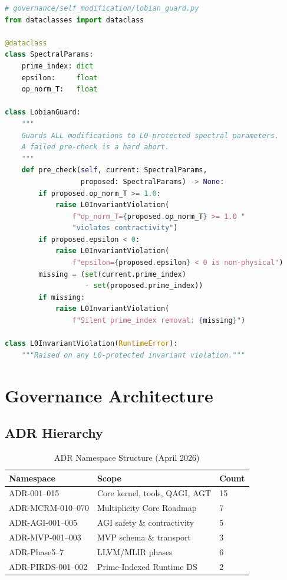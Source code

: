 \documentclass[12pt,a4paper]{article}
\theoremstyle{definition}
\theoremstyle{plain}
\theoremstyle{remark}
\begin{document}
\begin{lstlisting}[language=Python, style=pythonstyle,
  caption={Lobian guard protecting L0 spectral fields},
  label={lst:lobian}]
# governance/self_modification/lobian_guard.py
from dataclasses import dataclass

@dataclass
class SpectralParams:
    prime_index: dict
    epsilon:     float
    op_norm_T:   float

class LobianGuard:
    """
    Guards ALL modifications to L0-protected spectral parameters.
    A failed pre-check is a hard abort.
    """
    def pre_check(self, current: SpectralParams,
                  proposed: SpectralParams) -> None:
        if proposed.op_norm_T >= 1.0:
            raise L0InvariantViolation(
                f"op_norm_T={proposed.op_norm_T} >= 1.0 "
                "violates contractivity")
        if proposed.epsilon < 0:
            raise L0InvariantViolation(
                f"epsilon={proposed.epsilon} < 0 is non-physical")
        missing = (set(current.prime_index)
                   - set(proposed.prime_index))
        if missing:
            raise L0InvariantViolation(
                f"Silent prime_index removal: {missing}")

class L0InvariantViolation(RuntimeError):
    """Raised on any L0-protected invariant violation."""
\end{lstlisting}

\newpage

\section{Governance Architecture}
\label{sec:gov}

\subsection{ADR Hierarchy}

\begin{table}[h!]
\centering
\caption{ADR Namespace Structure (April 2026)}
\begin{tabular}{lll}
\toprule
\textbf{Namespace} & \textbf{Scope} & \textbf{Count} \\
\midrule
ADR-001--015     & Core kernel, tools, QAGI, AGT   & 15 \\
ADR-MCRM-010--070 & Multiplicity Core Roadmap       & 7 \\
ADR-AGI-001--005 & AGI safety \& contractivity     & 5 \\
ADR-MVP-001--003 & MVP schema \& transport         & 3 \\
ADR-Phase5--7    & LLVM/MLIR phases                & 6 \\
ADR-PIRDS-001--002 & Prime-Indexed Runtime DS      & 2 \\
\bottomrule
\end{tabular}
\end{table}
\end{document}
